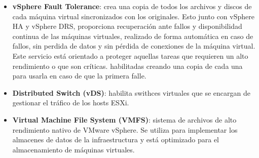 \begin{itemize}
    \item \textbf{vSphere Fault Tolerance}: crea una copia de todos los archivos y discos de cada máquina virtual sincronizados con los originales. Esto junto con vSphere HA y vSphere DRS, proporciona recuperación ante fallos y  disponibilidad continua de las máquinas virtuales, realizado de forma automática en caso de fallos, sin perdida de datos y sin pérdida de conexiones de la máquina virtual. Este servicio está orientado a proteger aquellas tareas que requieren un alto rendimiento o que son críticas. habilitadas creando una copia de cada una  para usarla en caso de que la primera falle.
    
    \item \textbf{Distributed Switch (vDS)}: habilita swithces virtuales que se encargan de gestionar el tráfico de los hosts ESXi.
    
    \item \textbf{Virtual Machine File System (VMFS)}: sistema de archivos de alto rendimiento nativo de VMware vSphere. Se utiliza para implementar los almacenes de datos de la infraestructura y está optimizado para el almacenamiento de máquinas virtuales.
\end{itemize}

